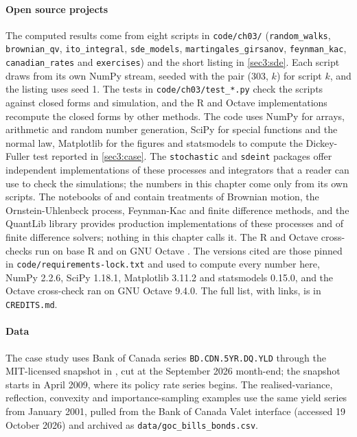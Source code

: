 \begin{chapterrefs}
\paragraph{Open source projects}
\begin{sloppypar}
The computed results come from eight scripts in \texttt{code/ch03/} (\texttt{random\_walks},
\texttt{brownian\_qv}, \texttt{ito\_integral}, \texttt{sde\_models}, \texttt{martingales\_girsanov},
\texttt{feynman\_kac}, \texttt{canadian\_rates} and \texttt{exercises}) and the short listing in
\cref{sec3:sde}. Each script draws from its own NumPy stream, seeded with the pair (303, $k$) for
script $k$, and the listing uses seed 1. The tests in \texttt{code/ch03/test\_*.py} check the scripts
against closed forms and simulation, and the R and Octave implementations recompute the closed forms
by other methods. The code uses NumPy \parencite{numpy} for arrays, arithmetic and random number generation,
SciPy \parencite{scipy} for special functions and the normal law, Matplotlib \parencite{matplotlib}
for the figures and statsmodels \parencite{statsmodels} to compute the Dickey-Fuller test reported in
\cref{sec3:case}. The \texttt{stochastic} \parencite{stochasticpy} and \texttt{sdeint} \parencite{sdeint} packages offer independent implementations of
these processes and integrators that a reader can use to check the simulations; the numbers in this
chapter come only from its own scripts. The notebooks of \textcite{cantaro86} and \textcite{py4fi} contain
treatments of Brownian motion, the Ornstein-Uhlenbeck process, Feynman-Kac and finite difference
methods, and the QuantLib library \parencite{quantlib} provides production implementations of these
processes and of finite difference solvers; nothing in this chapter calls it. The R and Octave
cross-checks run on base R and on GNU Octave \parencite{octave}. The versions cited are those pinned in
\texttt{code/requirements-lock.txt} and used to compute every number here, NumPy 2.2.6, SciPy 1.18.1,
Matplotlib 3.11.2 and statsmodels 0.15.0, and the Octave cross-check ran on GNU Octave 9.4.0. The full list, with links, is in
\texttt{CREDITS.md}.
\end{sloppypar}

\paragraph{Data}
The case study uses Bank of Canada series \texttt{BD.CDN.5YR.DQ.YLD} through the MIT-licensed snapshot
in \textcite{khan2026policy}, cut at the September 2026 month-end; the snapshot starts in April 2009, where its policy rate
series begins. The realised-variance, reflection, convexity and importance-sampling examples use the
same yield series from January 2001, pulled from the Bank of Canada Valet interface (accessed 19
October 2026) and archived as \texttt{data/goc\_bills\_bonds.csv}.

\end{chapterrefs}
